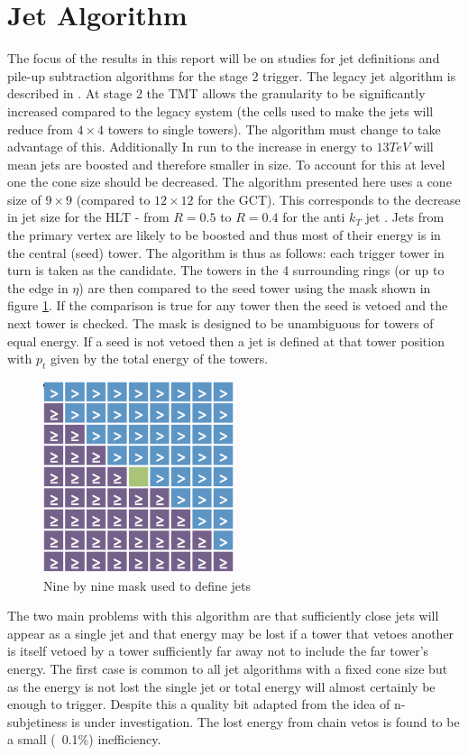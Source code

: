 \section{Jet Algorithm}
\label{algo}
The focus of the results in this report will be on studies for jet definitions and pile-up subtraction algorithms for the stage 2 trigger. The legacy jet algorithm is described in \cite{gctalgo}. At stage 2 the TMT allows the granularity to be significantly increased compared to the legacy system (the cells used to make the jets will reduce from $4\times4$ towers to single towers). The algorithm must change to take advantage of this. Additionally In run to the increase in energy to $13TeV$ will mean jets are  boosted and therefore smaller in size. To account for this at level one the cone size should be decreased. The algorithm presented here uses a cone size of $9\times9$ (compared to $12\times12$ for the GCT). This corresponds to the decrease in jet size for the HLT - from $R=0.5$ to $R=0.4$ for the anti $k_T$ jet \cite{Antik_t}. Jets from the primary vertex are likely to be boosted and thus most of their energy is in the central (seed) tower. The algorithm is thus as follows: each trigger tower in turn is taken as the candidate. The towers in the 4 surrounding rings (or up to the edge in $\eta$) are then compared to the seed tower using the mask shown in figure \ref{mask}. If the comparison is true for any tower then the seed is vetoed and the next tower is checked. The mask is designed to be unambiguous for towers of equal energy. If a seed is not vetoed then a jet is defined at that tower position with $p_t$ given by the total energy of the towers.   
\begin{figure}
\centering
    \includegraphics[width=0.5\textwidth]{Figures/mask.png}
  \caption{Nine by nine mask used to define jets}
  \label{mask}
\end{figure}
The two main problems with this algorithm are that sufficiently close jets will appear as a single jet and that energy may be lost if a tower that vetoes another is itself vetoed by a tower sufficiently far away not to include the far tower's energy. The first case is common to all jet algorithms with a fixed cone size but as the energy is not lost the single jet or total energy will almost certainly be enough to trigger. Despite this a quality bit adapted from the idea of n-subjetiness \cite{nsub} is under investigation. The lost energy from chain vetos is found to be a small (~0.1\%) inefficiency.

